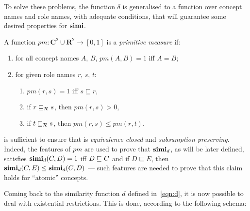 To solve these problems, the function \(\delta\) is generalised to a function over concept names and role names, with adequate conditions, that will guarantee some desired properties for \(\mathbf{simi}\).
\begin{definition}
  \label{dfn:pm}
  A function \(pm \colon \mathbf{C}^2 \cup \mathbf{R}^2 \to [0,1]\) is a \emph{primitive measure} if:
  \begin{enumerate}
    \item for all concept names \(A\), \(B\), \(pm(A,B) = 1\) iff \(A = B\);
    \item for given role names \(r\), \(s\), \(t\):
    \begin{enumerate}
      \item \(pm(r,s) = 1\) iff \(s \sqsubseteq r\),
      \item if \(r \sqsubseteq_{\mathcal{R}} s\), then \(pm(r,s) > 0\),
      \item if \(t \sqsubseteq_{\mathcal{R}} s\), then \(pm(r,s) \le pm(r,t)\).
    \end{enumerate}
  \end{enumerate}
\end{definition}
 is sufficient to ensure that \simi is \emph{equivalence closed} and \emph{subsumption preserving}. Indeed, the features of \(pm\) are used to prove that \(\mathbf{simi}_d\), as will be later defined, satisfies \(\mathbf{simi}_d(C,D) = 1\) iff \(D \sqsubseteq_{\mathcal{}} C\) and if \(D \sqsubseteq E\), then \(\mathbf{simi}_d(C,E) \le \mathbf{simi}_d(C,D)\) --- such features are needed to prove that this claim holds for ``atomic'' concepts.

Coming back to the similarity function \(d\) defined in~\eqref{eqn:d}, it is now possible to deal with existential restrictions.
This is done, according to the following schema:

